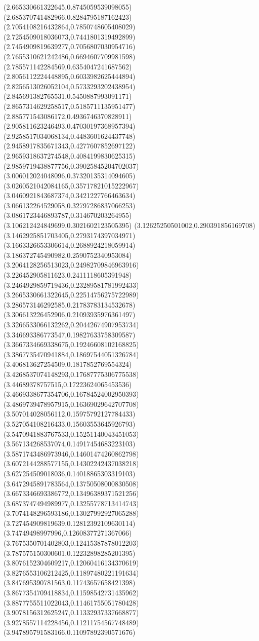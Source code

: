 {(2.665330661322645,0.8745059539098055)
(2.685370741482966,0.8284795187162423)
(2.7054108216432864,0.7850748605408029)
(2.7254509018036073,0.7441801319492899)
(2.7454909819639277,0.7056807030954716)
(2.7655310621242486,0.6694607709981598)
(2.785571142284569,0.6354047241687562)
(2.8056112224448895,0.6033982625444894)
(2.8256513026052104,0.5733293202438954)
(2.845691382765531,0.5450887993091171)
(2.8657314629258517,0.5185711135951477)
(2.885771543086172,0.4936746370828911)
(2.905811623246493,0.47030197368957394)
(2.9258517034068134,0.4483601624437748)
(2.9458917835671343,0.4277607852697122)
(2.9659318637274548,0.4084199830625315)
(2.9859719438877756,0.39025845204702037)
(3.006012024048096,0.37320135314094605)
(3.0260521042084165,0.35717821015222967)
(3.0460921843687374,0.3421227766463634)
(3.066132264529058,0.32797286837066253)
(3.0861723446893787,0.314670203264955)
(3.106212424849699,0.3021602123505395)
(3.12625250501002,0.290391856169708)
(3.1462925851703405,0.2793174397034971)
(3.1663326653306614,0.2688924218059914)
(3.186372745490982,0.2590752340953084)
(3.2064128256513023,0.24982709846963916)
(3.226452905811623,0.2411118605391948)
(3.2464929859719436,0.23289581781992433)
(3.2665330661322645,0.22514756275722989)
(3.286573146292585,0.21783783134532678)
(3.306613226452906,0.21093935976361497)
(3.3266533066132262,0.20442674907953734)
(3.346693386773547,0.19827633758309587)
(3.3667334669338675,0.19246608102168825)
(3.3867735470941884,0.18697544051326784)
(3.406813627254509,0.1817852769554324)
(3.4268537074148293,0.17687775306775538)
(3.44689378757515,0.17223624065453536)
(3.4669338677354706,0.16784524002950393)
(3.4869739478957915,0.16369029642707708)
(3.507014028056112,0.15975792127784433)
(3.527054108216433,0.15603553645926793)
(3.5470941883767533,0.15251140043451053)
(3.567134268537074,0.14917454683223103)
(3.5871743486973946,0.14601474260862798)
(3.6072144288577155,0.14302242437038218)
(3.627254509018036,0.14018865303319103)
(3.6472945891783564,0.13750508000830508)
(3.6673346693386772,0.13496389371521256)
(3.6873747494989977,0.13255778713414743)
(3.7074148296593186,0.13027992927065288)
(3.727454909819639,0.12812392109630114)
(3.74749498997996,0.12608377271367066)
(3.7675350701402803,0.12415387878012203)
(3.787575150300601,0.12232898285201395)
(3.8076152304609217,0.12060416134370619)
(3.8276553106212425,0.11897480221191634)
(3.847695390781563,0.11743657658421398)
(3.8677354709418834,0.11598542731435962)
(3.8877755511022043,0.11461755051780428)
(3.9078156312625247,0.11332937337668877)
(3.9278557114228456,0.11211754567748489)
(3.947895791583166,0.11097892390571676)
}
